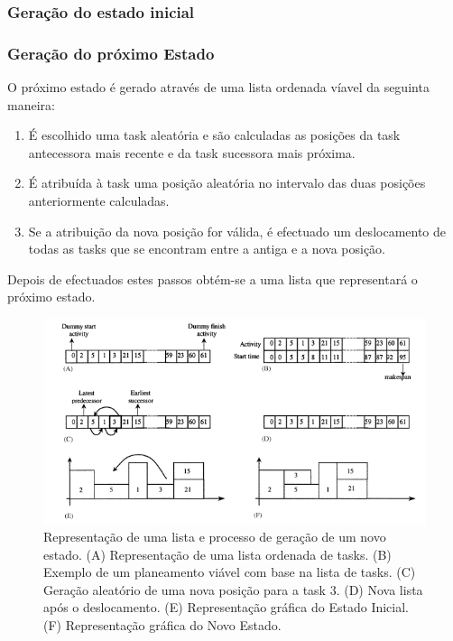 \begin{titlepage}
\subsubsection{Geração do estado inicial}


\subsubsection{Geração do próximo Estado}

O próximo estado é gerado através de uma lista ordenada víavel da seguinta maneira:
\begin{enumerate}
\item É escolhido uma task aleatória e são calculadas as posições da task antecessora mais recente e da task sucessora mais próxima.
\item É atribuída à task uma posição aleatória no intervalo das duas posições anteriormente calculadas.
\item Se a atribuição da nova posição for válida, é efectuado um deslocamento de todas as tasks que se encontram entre a antiga e a nova posição.
\end{enumerate}

Depois de efectuados estes passos obtém-se a uma lista que representará o próximo estado. 

\begin{figure}[ht!]
  \includegraphics[scale=0.8]{sa.png}
  \caption{Representação de uma lista e processo de geração de um novo estado. (A) Representação de uma lista ordenada de tasks. (B) Exemplo de um planeamento viável com base na lista de tasks. (C) Geração aleatório de uma nova posição para a task 3. (D) Nova lista após o deslocamento. (E) Representação gráfica do Estado Inicial. (F) Representação gráfica do Novo Estado.}
  \label{Simulated Annealing}
\end{figure}


\end{titlepage}
